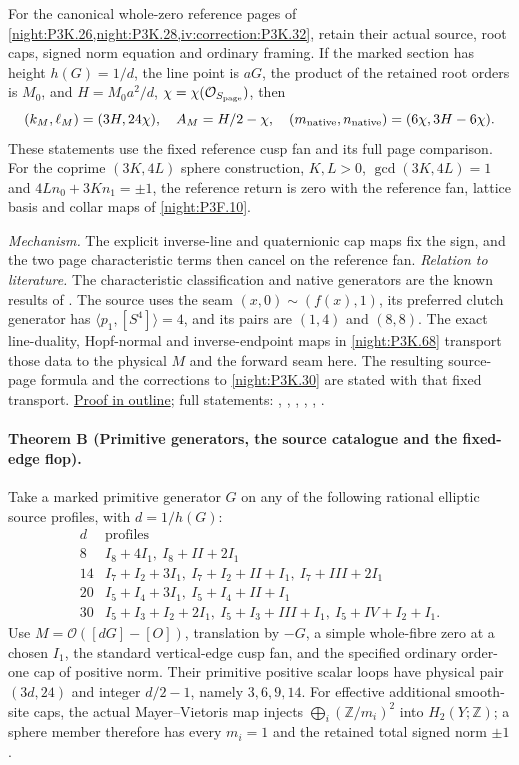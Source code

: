 For the canonical whole-zero reference pages of
\cref{night:P3K.26,night:P3K.28,iv:correction:P3K.32}, retain their
actual source, root caps, signed norm equation and ordinary framing.
If the marked section has height $h(G)=1/d$, the line point is $aG$,
the product of the retained root orders is $M_0$, and
$H=M_0a^2/d$, $\chi=\chi(\mathcal O_{S_{\rm page}})$, then
\[
 (k_M,\ell_M)=(3H,24\chi),\quad A_M=H/2-\chi,
 \quad(m_{\rm native},n_{\rm native})=(6\chi,3H-6\chi).
\]
These statements use the fixed reference cusp fan and its full page
comparison. For the coprime $(3K,4L)$ sphere construction,
$K,L>0$, $\gcd(3K,4L)=1$ and
$4Ln_0+3Kn_1=\pm1$, the reference return is zero with the reference
fan, lattice basis and collar maps of \cref{night:P3F.10}.

\textit{Mechanism.} The explicit inverse-line and quaternionic cap maps fix the sign,
and the two page characteristic terms then cancel on the reference fan.
\textit{Relation to literature.} The characteristic classification and native generators are the known results of \cite[Proposition~3.1, Lemmas~4.4 and~4.8, Theorem~4.9, and Lemma~6.2]{Jin2026}. The source uses the seam $(x,0)\sim(f(x),1)$, its preferred clutch generator has $\langle p_1,[S^4]\rangle=4$, and its pairs are $(1,4)$ and $(8,8)$. The exact line-duality, Hopf-normal and inverse-endpoint maps in \cref{night:P3K.68} transport those data to the physical $M$ and the forward seam here. The resulting source-page formula and the corrections to \cref{night:P3K.30} are stated with that fixed transport.
\hyperlink{outline-IV-A}{Proof in outline}; full statements: , , , , , .

\hypertarget{main-IV-B}{}
\paragraph{Theorem B (Primitive generators, the source catalogue and the fixed-edge flop).}
\label{series:IV:B}
Take a marked primitive generator $G$ on any of the following rational
elliptic source profiles, with $d=1/h(G)$:
\[
\begin{array}{c|l}
d&\text{profiles}\\\hline
8&I_8+4I_1,\ I_8+II+2I_1\\
14&I_7+I_2+3I_1,\ I_7+I_2+II+I_1,\ I_7+III+2I_1\\
20&I_5+I_4+3I_1,\ I_5+I_4+II+I_1\\
30&I_5+I_3+I_2+2I_1,\ I_5+I_3+III+I_1,\ I_5+IV+I_2+I_1.
\end{array}
\]
Use $M=\mathcal O([dG]-[O])$, translation by $-G$, a simple
whole-fibre zero at a chosen $I_1$, the standard vertical-edge cusp
fan, and the specified ordinary order-one cap of positive norm.
Their primitive positive scalar loops have physical pair $(3d,24)$
and integer $d/2-1$, namely $3,6,9,14$.
For effective additional smooth-site caps, the actual Mayer--Vietoris
map injects $\bigoplus_i(\mathbb Z/m_i)^2$ into $H_2(Y;\mathbb Z)$;
a sphere member therefore has every $m_i=1$ and the retained total
signed norm $\pm1$.

